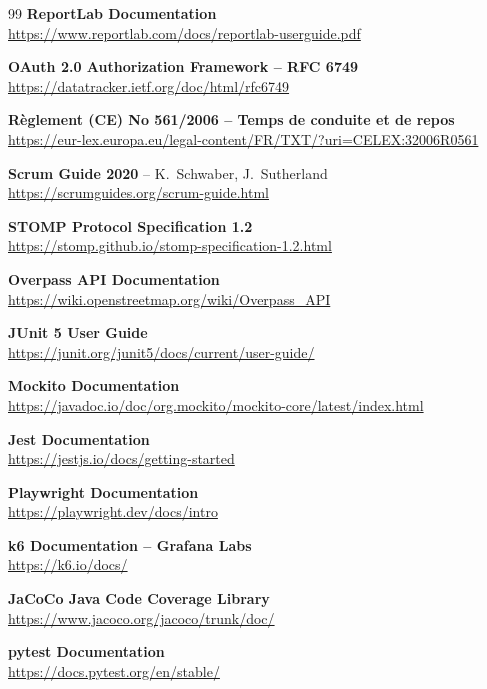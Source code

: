 \documentclass[12pt,a4paper]{report}
\begin{document}
\begin{thebibliography}{99}
\textbf{ReportLab Documentation}\\
\url{https://www.reportlab.com/docs/reportlab-userguide.pdf}

\textbf{OAuth 2.0 Authorization Framework -- RFC 6749}\\
\url{https://datatracker.ietf.org/doc/html/rfc6749}

\textbf{Règlement (CE) No 561/2006 -- Temps de conduite et de repos}\\
\url{https://eur-lex.europa.eu/legal-content/FR/TXT/?uri=CELEX:32006R0561}

\textbf{Scrum Guide 2020} -- K.~Schwaber, J.~Sutherland\\
\url{https://scrumguides.org/scrum-guide.html}

\textbf{STOMP Protocol Specification 1.2}\\
\url{https://stomp.github.io/stomp-specification-1.2.html}

\textbf{Overpass API Documentation}\\
\url{https://wiki.openstreetmap.org/wiki/Overpass_API}

\textbf{JUnit 5 User Guide}\\
\url{https://junit.org/junit5/docs/current/user-guide/}

\textbf{Mockito Documentation}\\
\url{https://javadoc.io/doc/org.mockito/mockito-core/latest/index.html}

\textbf{Jest Documentation}\\
\url{https://jestjs.io/docs/getting-started}

\textbf{Playwright Documentation}\\
\url{https://playwright.dev/docs/intro}

\textbf{k6 Documentation -- Grafana Labs}\\
\url{https://k6.io/docs/}

\textbf{JaCoCo Java Code Coverage Library}\\
\url{https://www.jacoco.org/jacoco/trunk/doc/}

\textbf{pytest Documentation}\\
\url{https://docs.pytest.org/en/stable/}

\end{thebibliography}
\end{document}
